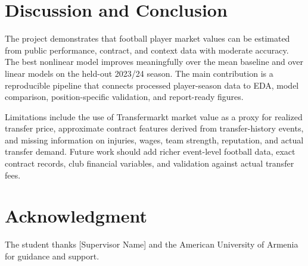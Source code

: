 \documentclass[conference]{IEEEtran}
\begin{document}
\section{Discussion and Conclusion}
The project demonstrates that football player market values can be estimated from public performance, contract, and context data with moderate accuracy. The best nonlinear model improves meaningfully over the mean baseline and over linear models on the held-out 2023/24 season. The main contribution is a reproducible pipeline that connects processed player-season data to EDA, model comparison, position-specific validation, and report-ready figures.

Limitations include the use of Transfermarkt market value as a proxy for realized transfer price, approximate contract features derived from transfer-history events, and missing information on injuries, wages, team strength, reputation, and actual transfer demand. Future work should add richer event-level football data, exact contract records, club financial variables, and validation against actual transfer fees.

\section*{Acknowledgment}
The student thanks [Supervisor Name] and the American University of Armenia for guidance and support.



\end{document}
